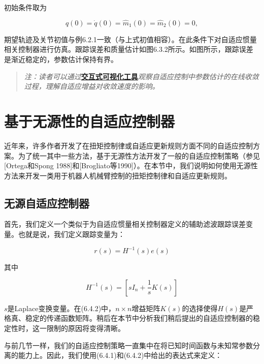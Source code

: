 \documentclass[12pt,a4paper]{ctexart}
\begin{document}
初始条件取为

\begin{equation}\tag{11}
q(0)=\dot{q}(0)=\hat{m}_1(0)=\hat{m}_2(0)=0,
\end{equation}

期望轨迹及关节初值与例6.2.1一致（与上式初值相容）。在此条件下对自适应惯量相关控制器进行仿真。跟踪误差和质量估计如图6.3.2所示。如图所示，跟踪误差是渐近稳定的，参数估计保持有界。

\begin{quote}
\textit{注：读者可以通过}\href{https://frankjie09.github.io/Robot-Manipulator-Control-CN/figures/Adaptive_Control.html}{\textbf{交互式可视化工具}}\textit{观察自适应控制中参数估计的在线收敛过程，理解自适应增益对收敛速度的影响。}
\end{quote}

\section{基于无源性的自适应控制器}\label{sec:passivity}

近年来，许多作者开发了在扭矩控制律或自适应更新规则方面不同的自适应控制方案。为了统一其中一些方法，基于无源性方法开发了一般的自适应控制策略（参见[Ortega和Spong 1988]和[Brogliato等1990]）。在本节中，我们说明如何使用无源性方法来开发一类用于机器人机械臂控制的扭矩控制律和自适应更新规则。

\subsection*{无源自适应控制器}

首先，我们定义一个类似于为自适应惯量相关控制器定义的辅助滤波跟踪误差变量。也就是说，我们定义跟踪变量为：

\begin{equation}\label{eq:6.4.1}
r(s) = H^{-1}(s) e(s)
\end{equation}

其中

\begin{equation}\label{eq:6.4.2}
H^{-1}(s) = \left[sI_n + \frac{1}{s}K(s)\right]
\end{equation}

$s$是Laplace变换变量。在(6.4.2)中，$n \times n$增益矩阵$K(s)$的选择使得$H(s)$是严格真、稳定的传递函数矩阵。稍后在本节中分析我们稍后提出的自适应控制器的稳定性时，这一限制的原因将变得清晰。

与前几节一样，我们的自适应控制策略一直集中在将已知时间函数与未知常参数分离的能力上。因此，我们使用(6.4.1)和(6.4.2)中给出的表达式来定义：
\end{document}
